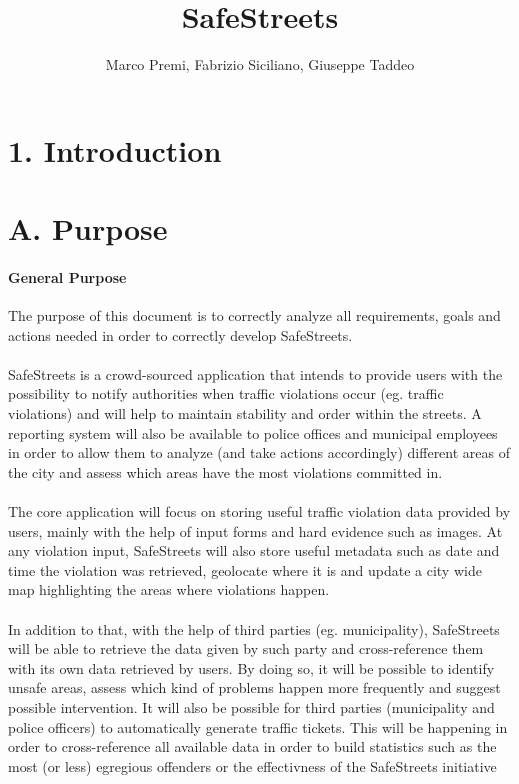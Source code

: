 \documentclass{report}
\title{SafeStreets}
\author{Marco Premi, Fabrizio Siciliano, Giuseppe Taddeo}
\begin{document}
\maketitle

\section*{1. Introduction}
    \section*{A. Purpose}
    \paragraph{General Purpose}
    The purpose of this document is to correctly analyze all requirements, goals 
    and actions needed in order to correctly develop SafeStreets.\\
    \\
    SafeStreets is a crowd-sourced application that intends to provide users with the possibility to notify authorities when
    traffic violations occur (eg. traffic violations) and will help to maintain stability and order within the streets. A reporting
    system will also be available to police offices and municipal employees in order to allow them to analyze (and take actions accordingly)
    different areas of the city and assess which areas have the most violations committed in.\\
    \\
    The core application will focus on storing useful traffic violation data provided by users, mainly with the help of input forms and
    hard evidence such as images. At any violation input, SafeStreets will also store useful metadata such as date and time the violation 
    was retrieved, geolocate where it is and update a city wide map highlighting the areas where violations happen.\\
    \\
    In addition to that, with the help of third parties (eg. municipality), SafeStreets will be able to retrieve the data given by such party
    and cross-reference them with its own data retrieved by users. By doing so, it will be possible to identify unsafe areas, assess which kind 
    of problems happen more frequently and suggest possible intervention. It will also be possible for third parties (municipality and police officers)
    to automatically generate traffic tickets. This will be happening in order to cross-reference all available data in order to build statistics such 
    as the most (or less) egregious offenders or the effectivness of the SafeStreets initiative
\end{document}
